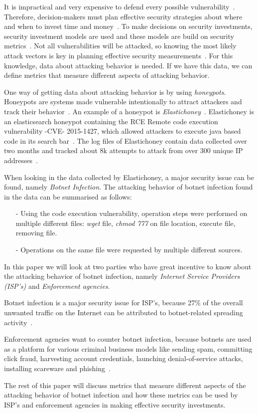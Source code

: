 \label{cap:sec1}

It is impractical and very expensive to defend every possible vulnerability~\cite{TARA}. Therefore, decision-makers must plan effective security strategies about where and when to invest time and money~\cite{ROSI}. To make decisions on security investments, security investment models are used and these models are build on security metrics~\cite{BR2010}. Not all vulnerabilities will be attacked, so knowing the most likely attack vectors is key in planning effective security measurements~\cite{TARA}. For this knowledge, data about attacking behavior is needed. If we have this data, we can define metrics that measure different aspects of attacking behavior.

One way of getting data about attacking behavior is by using \textit{honeypots}. Honeypots are systems made vulnerable intentionally to attract attackers and track their behavior~\cite{WP2010}. An example of a honeypot is \textit{Elastichoney}~\cite{BR2010}. Elastichoney is an elasticsearch honeypot containing the RCE Remote code execution vulnerability -CVE- 2015-1427, which allowed attackers to execute java based code in its search bar~\cite{CVE}. The log files of Elastichoney contain data collected over two months and tracked about 8k attempts to attack from over 300 unique IP addresses~\cite{BR2010}.

When looking in the data collected by Elastichoney, a major security issue can be found, namely \textit{Botnet Infection}. The attacking behavior of botnet infection found in the data can be summarised as follows:
\begin{itemize}
\item[-] Using the code execution vulnerability, operation steps were performed on multiple different files: \textit{wget} file, \textit{chmod 777} on file location, execute file, removing file.   
\item[-] Operations on the same file were requested by multiple different sources.
\end{itemize}
In this paper we will look at two parties who have great incentive to know about the attacking behavior of botnet infection, namely \textit{Internet Service Providers (ISP's)} and \textit{Enforcement agencies}.

Botnet infection is a major security issue for ISP's, because 27\% of the overall unwanted traffic on the Internet can be attributed to botnet-related spreading activity~\cite{AM2006}. 

Enforcement agencies want to counter botnet infection, because botnets are used as a platform for various criminal business models like sending spam, committing click fraud, harvesting account credentials, launching denial-of-service attacks, installing scareware and phishing~\cite{AR2013}.

The rest of this paper will discuss metrics that measure different aspects of the attacking behavior of botnet infection and how these metrics can be used by ISP's and enforcement agencies in making effective security investments.

